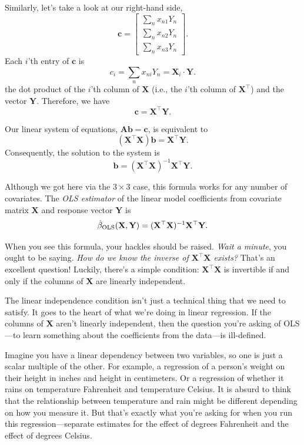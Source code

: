 \documentclass[12pt,oneside,openany]{book}
\begin{document}
Similarly, let's take a look at our right-hand side, \[
\mathbf{c} = \begin{bmatrix}
\sum_n x_{n1} Y_n \\
\sum_n x_{n2} Y_n \\
\sum_n x_{n3} Y_n
\end{bmatrix}.
\] Each \(i\)'th entry of \(\mathbf{c}\) is \[
c_i = \sum_n x_{ni} Y_n = \mathbf{X}_i \cdot \mathbf{Y}.
\] the dot product of the \(i\)'th column of \(\mathbf{X}\) (i.e., the
\(i\)'th column of \(\mathbf{X}^\top\)) and the vector \(\mathbf{Y}\).
Therefore, we have \[
\mathbf{c} = \mathbf{X}^\top \mathbf{Y}.
\]

Our linear system of equations, \(\mathbf{A} \mathbf{b} = \mathbf{c}\),
is equivalent to \[
(\mathbf{X}^\top \mathbf{X}) \mathbf{b} = \mathbf{X}^\top \mathbf{Y}.
\] Consequently, the solution to the system is \[
\mathbf{b} = (\mathbf{X}^\top \mathbf{X})^{-1} \mathbf{X}^\top \mathbf{Y}.
\]

Although we got here via the \(3 \times 3\) case, this formula works for
any number of covariates. The \emph{OLS estimator} of the linear model
coefficients from covariate matrix \(\mathbf{X}\) and response vector
\(\mathbf{Y}\) is \[
\hat{\beta}_{\text{OLS}}(\mathbf{X}, \mathbf{Y})
= (\mathbf{X}^\top \mathbf{X})^{-1} \mathbf{X}^\top \mathbf{Y}.
\]

When you see this formula, your hackles should be raised. \emph{Wait a
minute}, you ought to be saying. \emph{How do we know the inverse of
\(\mathbf{X}^\top \mathbf{X}\) exists?} That's an excellent question!
Luckily, there's a simple condition: \(\mathbf{X}^\top \mathbf{X}\) is
invertible if and only if the columns of \(\mathbf{X}\) are linearly
independent.

The linear independence condition isn't just a technical thing that we
need to satisfy. It goes to the heart of what we're doing in linear
regression. If the columns of \(\mathbf{X}\) aren't linearly
independent, then the question you're asking of OLS---to learn something
about the coefficients from the data---is ill-defined.

Imagine you have a linear dependency between two variables, so one is
just a scalar multiple of the other. For example, a regression of a
person's weight on their height in inches and height in centimeters. Or
a regression of whether it rains on temperature Fahrenheit and
temperature Celsius. It is absurd to think that the relationship between
temperature and rain might be different depending on how you measure it.
But that's exactly what you're asking for when you run this
regression---separate estimates for the effect of degrees Fahrenheit and
the effect of degrees Celsius.
\end{document}

